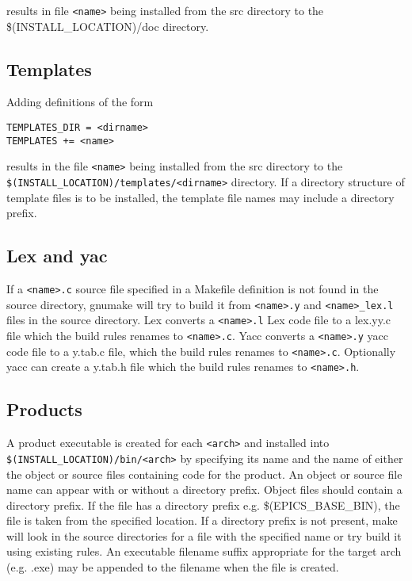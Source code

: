 results in file \verb|<name>| being installed from the src directory to the \$(INSTALL\_LOCATION)/doc directory. 

\subsection{Templates}

Adding definitions of the form

\begin{verbatim}
TEMPLATES_DIR = <dirname>
TEMPLATES += <name>
\end{verbatim}

results in the file \verb|<name>| being installed from the src directory to the \verb|$(INSTALL_LOCATION)/templates/<dirname>| 
directory. If a directory structure of template files is to be installed, the template file names may include a directory prefix.

\subsection{Lex and yac}

If a \verb|<name>.c| source file specified in a Makefile definition is not found in the source directory, gnumake will try to build 
it from \verb|<name>.y| and \verb|<name>_lex.l| files in the source directory. Lex converts a \verb|<name>.l| Lex code file to a lex.yy.c file 
which the build rules renames to \verb|<name>.c|. Yacc converts a \verb|<name>.y| yacc code file to a y.tab.c file, which the build 
rules renames to \verb|<name>.c|. Optionally yacc can create a y.tab.h file which the build rules renames to \verb|<name>.h|.

\subsection{Products}

A product executable is created for each \verb|<arch>| and installed into \verb|$(INSTALL_LOCATION)/bin/<arch>| by specifying its 
name and the name of either the object or source files containing code for the product. An object or source file name can 
appear with or without a directory prefix. Object files should contain a directory prefix. If the file has a directory prefix 
e.g. \$(EPICS\_BASE\_BIN), the file is taken from the specified location. If a directory prefix is not present, make will look 
in the source directories for a file with the specified name or try build it using existing rules. An executable filename 
suffix appropriate for the target arch (e.g. .exe) may be appended to the filename when the file is created.

